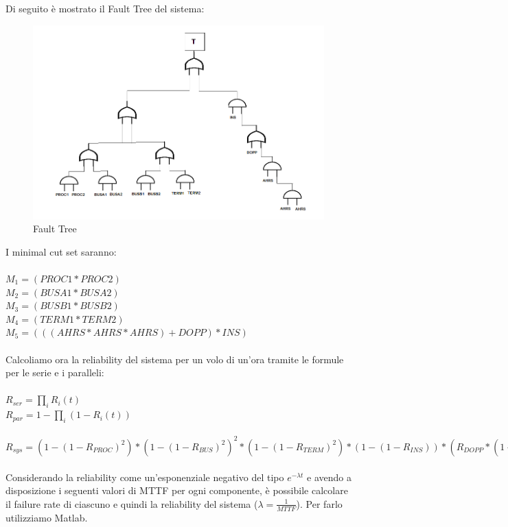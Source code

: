 	Di seguito è mostrato il Fault Tree del sistema:
	
	\begin{figure}[H]
		\centering
		\includegraphics[scale=0.7]{./immagine/fault_tree_es5.png}
		\caption{Fault Tree}
		\label{fig:fault_tree_es5}
	\end{figure}
	
	I minimal cut set saranno:\\\\
	$ M_{1}=(PROC1*PROC2)$\\
	$M_{2}=(BUSA1*BUSA2)$\\$M_{3}=(BUSB1*BUSB2)$\\$M_{4}=(TERM1*TERM2)$\\$M_{5}=(((AHRS*AHRS*AHRS)+DOPP)*INS) $\\\\
	Calcoliamo ora la reliability del sistema per un volo di un'ora tramite le formule per le serie e i paralleli:\\\\
	$ R_{ser}=\prod_{i}^{}R_{i}(t) $\\
	$ R_{par}=1-\prod_{i}^{}(1-R_{i}(t)) $\\\\
	$ R_{sys}=(1-(1-R_{PROC})^{2})*(1-(1-R_{BUS})^{2})^{2}*(1-(1-R_{TERM})^{2})*(1-(1-R_{INS}))*(R_{DOPP}*(1-(1-R_{AHRS})^{3})) $\\\\
	
	Considerando la reliability come un'esponenziale negativo del tipo $ e^{-\lambda t} $ e avendo a disposizione i seguenti valori di MTTF per ogni componente, è possibile calcolare il failure rate di ciascuno e quindi la reliability del sistema ($\lambda=\frac{1}{MTTF}$). Per farlo utilizziamo Matlab.
	
